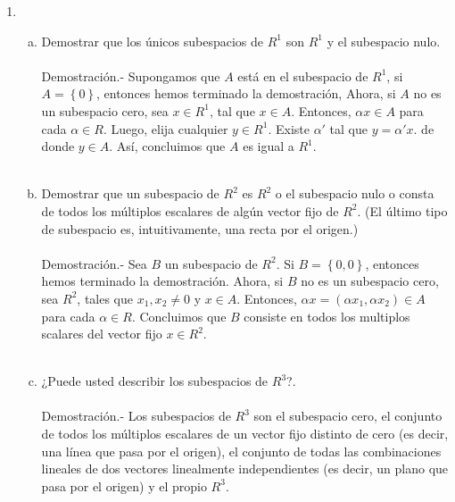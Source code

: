 \begin{enumerate}[\bfseries 1.]
\begin{enumerate}[(a)]
	\end{enumerate}

    \item 
	\begin{enumerate}[(a)]

	    \item Demostrar que los únicos subespacios de $R^1$ son $R^1$ y el subespacio nulo.\\\\
		Demostración.-\; Supongamos que $A$ está en el subespacio de $R^1$, si $A=\left\{0\right\}$, entonces hemos terminado la demostración, Ahora, si $A$ no es un subespacio cero, sea $x\in R^1$, tal que $x\in A$. Entonces, $\alpha x\in A$ para cada $\alpha\in R$. Luego, elija cualquier $y\in R^1$. Existe $\alpha'$ tal que $y=\alpha'x$. de donde $y\in A$. Así, concluimos que $A$ es igual a $R^1$.\\\\

	    \item Demostrar que un subespacio de $R^2$ es $R^2$ o el subespacio nulo o consta de todos los múltiplos escalares de algún vector fijo de $R^2$. (El último tipo de subespacio es, intuitivamente, una recta por el origen.)\\\\
		Demostración.-\; Sea $B$ un subespacio de $R^2$. Si $B=\left\{0,0\right\}$, entonces hemos terminado la demostración. Ahora, si $B$ no es un subespacio cero, sea $R^2$, tales que $x_1,x_2\neq 0$ y $x\in A$. Entonces, $\alpha x=(\alpha x_1,\alpha x_2)\in A$ para cada $\alpha\in R$. Concluimos que $B$ consiste en todos los multiplos scalares del vector fijo $x\in R^2$.\\\\

	    \item ¿Puede usted describir los subespacios de $R^3$?.\\\\
		Demostración.-\; Los subespacios de $R^3$ son el subespacio cero, el conjunto de todos los múltiplos escalares de un vector fijo distinto de cero (es decir, una línea que pasa por el origen), el conjunto de todas las combinaciones lineales de dos vectores linealmente independientes (es decir, un plano que pasa por el origen) y el propio $R^3$.\\\\

	\end{enumerate}


\end{enumerate}
